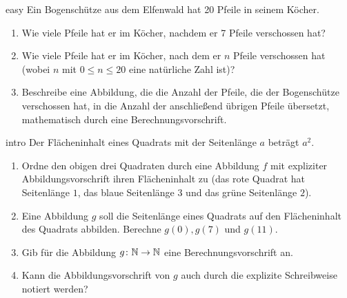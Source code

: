 \documentclass[../funktionen.tex]{subfiles}
\begin{document}
\begin{exercise}{easy}
    Ein Bogenschütze aus dem Elfenwald hat 20 Pfeile in seinem Köcher.
    \begin{enumerate}
        \item Wie viele Pfeile hat er im Köcher, nachdem er 7 Pfeile verschossen hat?
        \item Wie viele Pfeile hat er im Köcher, nach dem er $n$ Pfeile verschossen hat (wobei $n$ mit $0\leq n\leq 20$ eine natürliche Zahl ist)?
        \item Beschreibe eine Abbildung, die die Anzahl der Pfeile, die der Bogenschütze verschossen hat, in die Anzahl der anschließend übrigen Pfeile übersetzt, mathematisch durch eine Berechnungsvorschrift.
    \end{enumerate}
\end{exercise}
\begin{exercise}{intro}
    Der Flächeninhalt eines Quadrats mit der Seitenlänge $a$ beträgt $a^2$.
    \begin{center}
    \end{center}
    \begin{enumerate}
        \item Ordne den obigen drei Quadraten durch eine Abbildung $f$ mit expliziter Abbildungsvorschrift ihren Flächeninhalt zu (das rote Quadrat hat Seitenlänge $1$, das blaue Seitenlänge $3$ und das grüne Seitenlänge $2$).
        \item Eine Abbildung $g$ soll die Seitenlänge eines Quadrats auf den Flächeninhalt des Quadrats abbilden. Berechne $g(0), g(7)$ und $g(11)$.
        \item Gib für die Abbildung $g\colon\mathbb{N}\rightarrow\mathbb{N}$ eine Berechnungsvorschrift an.
        \item Kann die Abbildungsvorschrift von $g$ auch durch die explizite Schreibweise notiert werden?
    \end{enumerate}
\end{exercise}
\end{document}
